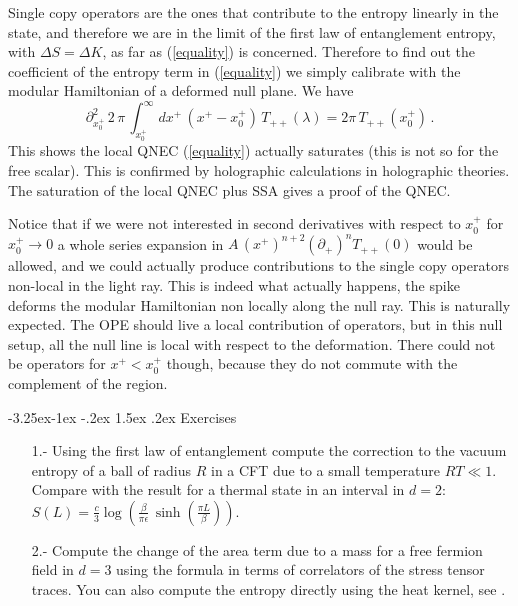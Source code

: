 \documentclass[11pt,a4paper]{article}
\makeatletter
\renewcommand\subsection{\@startsection{subsection}{2}{\z@}%
                                   {-3.25ex\@plus -1ex \@minus -.2ex}%
                                     {1.5ex \@plus .2ex}%
                                     {\normalfont\bfseries}}
\numberwithin{equation}{section}
\newcommand{\be}{\begin{equation}}
\newcommand{\ee}{\end{equation}}
\makeatother
\begin{document}
Single copy operators are the ones that contribute to the entropy linearly in the state, and therefore we are in the limit of the first law of entanglement entropy, with $\Delta S=\Delta K$, as far as (\ref{equality}) is concerned. Therefore to find out the coefficient of the entropy term in (\ref{equality}) we simply calibrate with the modular Hamiltonian of a deformed null plane. We have
\be
\partial_{x_0^+}^2 \,2 \,\pi\,\int_{x_0^+}^\infty dx^+\, (x^+-x_0^+)\,T_{++}(\lambda)=2 \pi \, T_{++}(x_0^+)\,.
\ee
This shows the local QNEC (\ref{equality}) actually saturates (this is not so for the free scalar). 
This is confirmed by holographic calculations in holographic theories. The saturation of the local QNEC plus SSA gives a proof of the QNEC. 

Notice that if we were not interested in second derivatives with respect to $x^+_0$ for $x_0^+\rightarrow 0$ a whole series expansion in $A \,(x^+)^{n+2} (\partial_+)^n T_{++}(0)$ would be allowed, and we could actually produce contributions to the single copy operators non-local in the light ray. This is indeed what actually happens, the spike deforms the modular Hamiltonian non locally along the null ray. This is naturally expected. The OPE should live a local contribution of operators, but in this null setup, all the null line is local with respect to the deformation. There could not be operators for $x^+< x^+_0$ though, because they do not commute with the complement of the region.        

\subsection{Exercises}

\begin{itemize}

\item[1.-] Using the first law of entanglement compute the correction to the vacuum entropy of a ball of radius $R$ in a CFT due to a small temperature $R T\ll 1$. Compare with the result for a thermal state in an interval in $d=2$: $S(L)=\frac{c}{3} \log\left(\frac{\beta}{\pi\epsilon}\,\sinh\left(\frac{\pi L}{\beta}\right)\right)$.

\item[2.-] Compute the change of the area term due to a mass for a free fermion field in $d=3$ using the formula in terms of correlators of the stress tensor traces. You can also compute the entropy directly using the heat kernel, see \cite{Hertzberg:2010uv}. 

\end{itemize}
\end{document}
